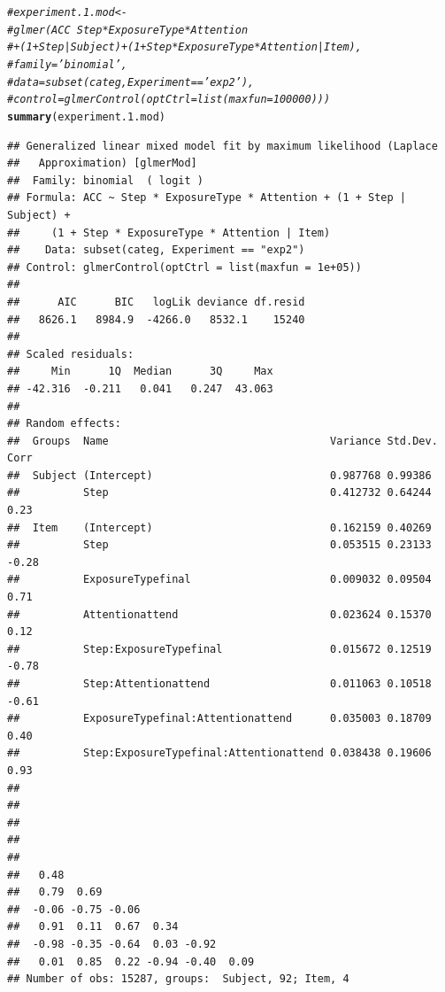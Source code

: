 \documentclass[11pt]{article}\usepackage[]{graphicx}\usepackage[]{color}
\makeatletter
\newcommand{\hlcom}[1]{\textcolor[rgb]{0.678,0.584,0.686}{\textit{#1}}}%
\newcommand{\hlstd}[1]{\textcolor[rgb]{0.345,0.345,0.345}{#1}}%
\newcommand{\hlkwd}[1]{\textcolor[rgb]{0.737,0.353,0.396}{\textbf{#1}}}%
\newenvironment{kframe}{%
 \def\at@end@of@kframe{}%
 \ifinner\ifhmode%
  \def\at@end@of@kframe{\end{minipage}}%
  \begin{minipage}{\columnwidth}%
 \fi\fi%
 \def\FrameCommand##1{\hskip\@totalleftmargin \hskip-\fboxsep
 \colorbox{shadecolor}{##1}\hskip-\fboxsep
     \hskip-\linewidth \hskip-\@totalleftmargin \hskip\columnwidth}%
 \MakeFramed {\advance\hsize-\width
   \@totalleftmargin\z@ \linewidth\hsize
   \@setminipage}}%
 {\par\unskip\endMakeFramed%
 \at@end@of@kframe}
\newenvironment{knitrout}{}{} %
\makeatother
\begin{document}
\begin{knitrout}\footnotesize
{}\color{fgcolor}\begin{kframe}
\begin{alltt}
 \hlcom{#experiment.1.mod <- }
 \hlcom{#glmer(ACC ~ Step*ExposureType*Attention}
 \hlcom{#+ (1+Step|Subject) + (1+Step*ExposureType*Attention|Item),}
 \hlcom{#family='binomial',}
 \hlcom{#data = subset(categ, Experiment == 'exp2'),}
 \hlcom{#control = glmerControl(optCtrl = list(maxfun = 100000) ))}
 \hlkwd{summary}\hlstd{(experiment.1.mod)}
\end{alltt}
\begin{verbatim}
## Generalized linear mixed model fit by maximum likelihood (Laplace
##   Approximation) [glmerMod]
##  Family: binomial  ( logit )
## Formula: ACC ~ Step * ExposureType * Attention + (1 + Step | Subject) +  
##     (1 + Step * ExposureType * Attention | Item)
##    Data: subset(categ, Experiment == "exp2")
## Control: glmerControl(optCtrl = list(maxfun = 1e+05))
## 
##      AIC      BIC   logLik deviance df.resid 
##   8626.1   8984.9  -4266.0   8532.1    15240 
## 
## Scaled residuals: 
##     Min      1Q  Median      3Q     Max 
## -42.316  -0.211   0.041   0.247  43.063 
## 
## Random effects:
##  Groups  Name                                   Variance Std.Dev. Corr 
##  Subject (Intercept)                            0.987768 0.99386       
##          Step                                   0.412732 0.64244  0.23 
##  Item    (Intercept)                            0.162159 0.40269       
##          Step                                   0.053515 0.23133  -0.28
##          ExposureTypefinal                      0.009032 0.09504   0.71
##          Attentionattend                        0.023624 0.15370   0.12
##          Step:ExposureTypefinal                 0.015672 0.12519  -0.78
##          Step:Attentionattend                   0.011063 0.10518  -0.61
##          ExposureTypefinal:Attentionattend      0.035003 0.18709   0.40
##          Step:ExposureTypefinal:Attentionattend 0.038438 0.19606   0.93
##                                     
##                                     
##                                     
##                                     
##                                     
##   0.48                              
##   0.79  0.69                        
##  -0.06 -0.75 -0.06                  
##   0.91  0.11  0.67  0.34            
##  -0.98 -0.35 -0.64  0.03 -0.92      
##   0.01  0.85  0.22 -0.94 -0.40  0.09
## Number of obs: 15287, groups:  Subject, 92; Item, 4

\end{verbatim}
\end{kframe}
\end{knitrout}
\end{document}
